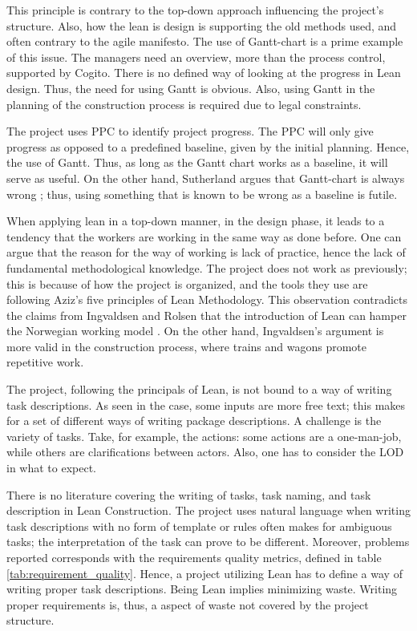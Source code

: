 This principle is contrary to the top-down approach influencing the project's structure. Also, how the lean is design is supporting the old methods used, and often contrary to the agile manifesto. The use of Gantt-chart is a prime example of this issue. The managers need an overview, more than the process control, supported by Cogito. There is no defined way of looking at the progress in Lean design. Thus, the need for using Gantt is obvious. Also, using Gantt in the planning of the construction process is required due to legal constraints. 

The project uses PPC to identify project progress. The PPC will only give progress as opposed to a predefined baseline, given by the initial planning. Hence, the use of Gantt. Thus, as long as the Gantt chart works as a baseline, it will serve as useful. On the other hand, Sutherland argues that Gantt-chart is always wrong \cite{sutherland}; thus, using something that is known to be wrong as a baseline is futile. 
    
When applying lean in a top-down manner, in the design phase, it leads to a tendency that the workers are working in the same way as done before. One can argue that the reason for the way of working is lack of practice, hence the lack of fundamental methodological knowledge. The project does not work as previously; this is because of how the project is organized, and the tools they use are following Aziz's five principles of Lean Methodology. This observation contradicts the claims from Ingvaldsen and Rolsen that the introduction of Lean can hamper the Norwegian working model \cite{ingvaldsen2012lean}. On the other hand, Ingvaldsen's argument is more valid in the construction process, where trains and wagons promote repetitive work.

The project, following the principals of Lean, is not bound to a way of writing task descriptions. As seen in the case, some inputs are more free text; this makes for a set of different ways of writing package descriptions. A challenge is the variety of tasks. Take, for example, the actions: some actions are a one-man-job, while others are clarifications between actors. Also, one has to consider the LOD in what to expect. 

There is no literature covering the writing of tasks, task naming, and task description in Lean Construction. The project uses natural language when writing task descriptions with no form of template or rules often makes for ambiguous tasks; the interpretation of the task can prove to be different. Moreover, problems reported corresponds with the requirements quality metrics, defined in table \ref{tab:requirement_quality}. Hence, a project utilizing Lean has to define a way of writing proper task descriptions. Being Lean implies minimizing waste. Writing proper requirements is, thus, a aspect of waste not covered by the project structure.

